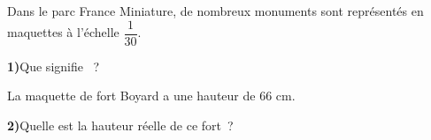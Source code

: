 \documentclass[activite]{thedocument}
\begin{document}
\noindent\begin{minipage}{.45\linewidth}
    Dans le parc France Miniature, de nombreux monuments sont représentés
    en maquettes à l'échelle $\dfrac1{30}$.\par\medskip\noindent
    {\bfseries 1)\;}Que signifie ~?
    \dotedline\dotedline\dotedline\par\noindent
    La maquette de fort Boyard a une hauteur de 66 cm.\par\medskip\noindent
    {\bfseries 2)\;}Quelle est la hauteur réelle de ce fort~?
\end{minipage}%
\begin{minipage}{.54\linewidth}
    \quad{}
\end{minipage}\par\noindent\begingroup{}\linewidth
\dotedline\dotedline\dotedline
\endgroup\par
\end{document}

